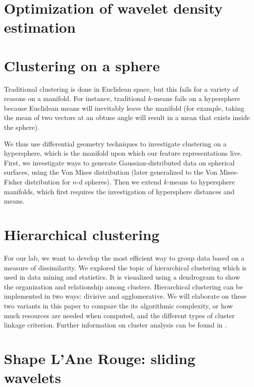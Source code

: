 \documentclass{article}
\begin{document}
\part{Optimization of wavelet density estimation}
  

\part{Clustering on a sphere}

  Traditional clustering is done in Euclidean space, but this fails for a variety of reasons on a manifold. For instance, traditional $k$-means fails on a hypersphere because Euclidean means will inevitably leave the manifold (for example, taking the mean of two vectors at an obtuse angle will result in a mean that exists inside the sphere).

  We thus use differential geometry techniques to investigate clustering on a hypersphere, which is the manifold upon which our feature representations live. First, we investigate ways to generate Gaussian-distributed data on spherical surfaces, using the Von Mises distribution (later generalized to the Von Mises-Fisher distribution for $n$-d spheres). Then we extend $k$-means to hypersphere manifolds, which first requires the investigation of hypersphere distances and means.

  
  
  
  

\part{Hierarchical clustering}

  For our lab, we want to develop the most efficient way to group data
  based on a measure of dissimilarity. We explored the topic of
  hierarchical clustering which is used in data mining and statistics.
  It is visualized using a dendrogram to show the organization and relationship
  among clusters. Hierarchical clustering can be implemented in two
  ways: divisive and agglomerative. We will elaborate on these two variants
  in this paper to compare the its algorithmic complexity, or how much
  resources are needed when computed, and the different types of cluster
  linkage criterion. Further information on cluster analysis can be
  found in \cite{ClusterAnalysis}.

  
  
  

\part{Shape L'Ane Rouge: sliding wavelets}
  
  

\newpage


\end{document}
